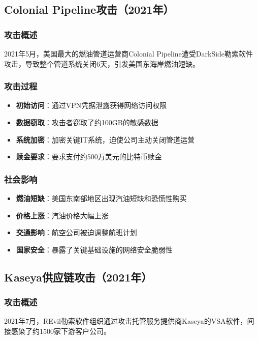\documentclass[12pt,a4paper]{article}
\begin{document}
\subsection{Colonial Pipeline攻击（2021年）}

\subsubsection{攻击概述}
2021年5月，美国最大的燃油管道运营商Colonial Pipeline遭受DarkSide勒索软件攻击，导致整个管道系统关闭6天，引发美国东海岸燃油短缺。

\subsubsection{攻击过程}
\begin{itemize}
    \item \textbf{初始访问}：通过VPN凭据泄露获得网络访问权限
    \item \textbf{数据窃取}：攻击者窃取了约100GB的敏感数据
    \item \textbf{系统加密}：加密关键IT系统，迫使公司主动关闭管道运营
    \item \textbf{赎金要求}：要求支付约500万美元的比特币赎金
\end{itemize}

\subsubsection{社会影响}
\begin{itemize}
    \item \textbf{燃油短缺}：美国东南部地区出现汽油短缺和恐慌性购买
    \item \textbf{价格上涨}：汽油价格大幅上涨
    \item \textbf{交通影响}：航空公司被迫调整航班计划
    \item \textbf{国家安全}：暴露了关键基础设施的网络安全脆弱性
\end{itemize}

\subsection{Kaseya供应链攻击（2021年）}

\subsubsection{攻击概述}
2021年7月，REvil勒索软件组织通过攻击托管服务提供商Kaseya的VSA软件，间接感染了约1500家下游客户公司。
\end{document}
